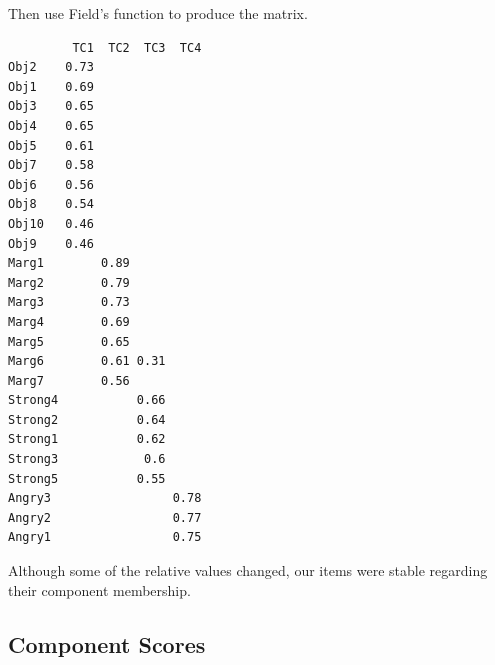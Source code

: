 \documentclass[
  english,
]{book}
\newenvironment{Shaded}{\begin{snugshade}}{\end{snugshade}}
\newcommand{\CommentTok}[1]{\textcolor[rgb]{0.56,0.35,0.01}{\textit{#1}}}
\newcommand{\ControlFlowTok}[1]{\textcolor[rgb]{0.13,0.29,0.53}{\textbf{#1}}}
\newcommand{\DataTypeTok}[1]{\textcolor[rgb]{0.13,0.29,0.53}{#1}}
\newcommand{\DecValTok}[1]{\textcolor[rgb]{0.00,0.00,0.81}{#1}}
\newcommand{\FloatTok}[1]{\textcolor[rgb]{0.00,0.00,0.81}{#1}}
\newcommand{\KeywordTok}[1]{\textcolor[rgb]{0.13,0.29,0.53}{\textbf{#1}}}
\newcommand{\NormalTok}[1]{#1}
\newcommand{\OperatorTok}[1]{\textcolor[rgb]{0.81,0.36,0.00}{\textbf{#1}}}
\newcommand{\StringTok}[1]{\textcolor[rgb]{0.31,0.60,0.02}{#1}}
\begin{document}
Then use Field's \citeyearpar{field_discovering_2012} function to produce the matrix.

\begin{Shaded}
\end{Shaded}

\begin{verbatim}
         TC1  TC2  TC3  TC4
Obj2    0.73               
Obj1    0.69               
Obj3    0.65               
Obj4    0.65               
Obj5    0.61               
Obj7    0.58               
Obj6    0.56               
Obj8    0.54               
Obj10   0.46               
Obj9    0.46               
Marg1        0.89          
Marg2        0.79          
Marg3        0.73          
Marg4        0.69          
Marg5        0.65          
Marg6        0.61 0.31     
Marg7        0.56          
Strong4           0.66     
Strong2           0.64     
Strong1           0.62     
Strong3            0.6     
Strong5           0.55     
Angry3                 0.78
Angry2                 0.77
Angry1                 0.75
\end{verbatim}

Although some of the relative values changed, our items were stable regarding their component membership.

\hypertarget{component-scores}{%
\subsection{Component Scores}\label{component-scores}}
\end{document}
